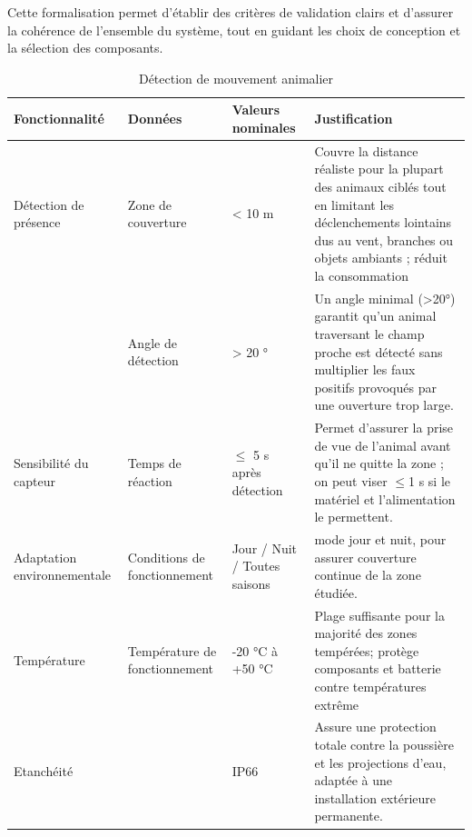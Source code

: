 Cette formalisation permet d'établir des critères de validation clairs et d'assurer la cohérence de l'ensemble du système, tout en guidant les choix de conception et la sélection des composants.

\begin{table}[ht]
   \centering
   \renewcommand{\arraystretch}{1.2} %
   \begin{tabularx}{\textwidth}{|X|p{2.5cm}|p{2cm}|X|}
      \hline
      \textbf{Fonctionnalité}     & \textbf{Données}              & \textbf{Valeurs nominales}   & \textbf{Justification}                                                                                                                                                         \\
      \hline
      Détection de présence       & Zone de couverture            & < 10 m                       & Couvre la distance réaliste pour la plupart des animaux ciblés tout en limitant les déclenchements lointains dus au vent, branches ou objets ambiants ; réduit la consommation \\
      \hline
                                  & Angle de détection            & > 20 °                       & Un angle minimal (>20°) garantit qu'un animal traversant le champ proche est détecté sans multiplier les faux positifs provoqués par une ouverture trop large.                 \\
      \hline
      Sensibilité du capteur      & Temps de réaction             & $\leq$ 5 s après détection   & Permet d'assurer la prise de vue de l'animal avant qu'il ne quitte la zone ; on peut viser $\leq$1 s si le matériel et l'alimentation le permettent.                           \\
      \hline
      Adaptation environnementale & Conditions de fonctionnement  & Jour / Nuit / Toutes saisons & mode jour et nuit, pour assurer couverture continue de la zone étudiée.                                                                                                        \\
      \hline
      Température                 & Température de fonctionnement & -20 °C à +50 °C              & Plage suffisante pour la majorité des zones tempérées; protège composants et batterie contre températures extrême                                                              \\
      \hline
      Etanchéité                  &                               & IP66                         & Assure une protection totale contre la poussière et les projections d'eau, adaptée à une installation extérieure permanente.                                                   \\
      \hline
   \end{tabularx}
   \caption{Détection de mouvement animalier}
\end{table}


